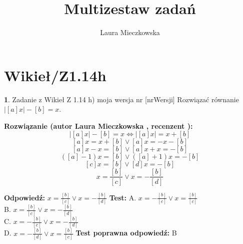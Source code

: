\documentclass[12pt, a4paper]{article}
\title{Multizestaw zadań}
\author{Laura Mieczkowska}
\date{}
\theoremstyle{definition} %
\newtheorem{zad}{}
\newcommand{\kategoria}[1]{\section{#1}} %
\newcommand{\zadStart}[1]{\begin{zad}#1\newline} %
\newcommand{\zadStop}{\end{zad}}   %
\newcommand{\rozwStart}[2]{\noindent \textbf{Rozwiązanie (autor #1 , recenzent #2): }\newline} %
\newcommand{\odpStart}{\noindent \textbf{Odpowiedź:}\newline}    %
\newcommand{\odpStop}{\newline}                                             %
\newcommand{\testStart}{\noindent \textbf{Test:}\newline} %
\newcommand{\testStop}{\newline} %
\newcommand{\kluczStart}{\noindent \textbf{Test poprawna odpowiedź:}\newline} %
\newcommand{\kluczStop}{\newline} %
\begin{document}
\maketitle


\kategoria{Wikieł/Z1.14h}
\zadStart{Zadanie z Wikieł Z 1.14 h) moja wersja nr [nrWersji]}
Rozwiązać równanie $|[a]x|-[b]=x$.
\zadStop
\rozwStart{Laura Mieczkowska}{}
$$|[a]x|-[b]=x \Longleftrightarrow |[a]x|=x+[b] $$ 
$$[a]x=x+[b] \vee [a]x=-x-[b]$$
$$[a]x-x=[b] \vee [a]x+x=-[b]$$
$$([a]-1)x=[b] \vee ([a]+1)x=-[b]$$
$$[c]x=[b] \vee [d]x=-[b]$$
$$x=\frac{[b]}{[c]} \vee x=-\frac{[b]}{[d]}$$

\odpStart
$x=\frac{[b]}{[c]} \vee x=-\frac{[b]}{[d]}$
\odpStop
\testStart
A. $x=-\frac{[b]}{[c]} \vee x=\frac{[b]}{[c]}$ \\
B. $x=\frac{[b]}{[c]} \vee x=-\frac{[b]}{[d]}$ \\
C. $x=-\frac{[b]}{[c]} \vee x=-\frac{[b]}{[d]}$ \\
D. $x=-\frac{[b]}{[d]} \vee x=\frac{[b]}{[c]}$ 
\testStop
\kluczStart
B
\kluczStop
\end{document}
